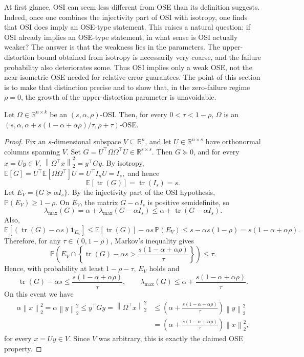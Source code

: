 \documentclass[onefignum,onetabnum]{siamart251216}
\newcommand{\R}{\mathbb{R}}
\newcommand{\E}{\mathbb{E}}
\newcommand{\Prob}{\mathbb{P}}
\newcommand{\norm}[1]{\left\lVert #1 \right\rVert}
\begin{document}
At first glance, OSI can seem less different from OSE than its definition suggests. Indeed, once one combines the injectivity part of OSI with isotropy, one finds that OSI does imply an OSE-type statement.  This raises a natural question: if OSI already implies an OSE-type statement, in what sense is OSI actually weaker? The answer is that the weakness lies in the parameters.  The upper-distortion bound obtained from isotropy is necessarily very coarse,  and the failure probability also deteriorates some.  Thus OSI implies only a weak OSE, not the near-isometric OSE needed for relative-error guarantees. The point of this section is to make that distinction precise and to show that, in the zero-failure regime $\rho=0$, the growth of the upper-distortion parameter is unavoidable. 

\begin{proposition}\label{prop:osi-markov-ose}
Let $\Omega\in\R^{n\times k}$ be an $(s,\alpha,\rho)$-OSI. Then, for every $0<\tau<1-\rho$, $\Omega$ is an $(s,\alpha,\alpha+s(1-\alpha+\alpha\rho)/\tau,\rho+\tau)$-OSE.
\end{proposition}

\begin{proof}
Fix an $s$-dimensional subspace $V\subseteq\R^n$, and let
$U\in\R^{n\times s}$ have orthonormal columns spanning $V$.
Set
$
G = U^\top \Omega\Omega^\top U \in \R^{s\times s}.
$
Then $G\succeq 0$, and for every $x=Uy\in V$,
$
\norm{\Omega^\top x}_2^2 = y^\top G y.
$ By isotropy,
$
\mathbb E[G]
= U^\top \mathbb E[\Omega\Omega^\top]U
= U^\top I_n U
= I_s,
$
and hence
\[
\mathbb E[\operatorname{tr}(G)] = \operatorname{tr}(I_s)=s.
\]
Let
$
E_V=\{G\succeq \alpha I_s\}.
$
By the injectivity part of the OSI hypothesis, $\Prob(E_V)\ge 1-\rho$.  On $E_V$, the matrix $G-\alpha I_s$ is positive semidefinite, so
\[
\lambda_{\max}(G)=
\alpha+\lambda_{\max}(G-\alpha I_s)
\le
\alpha+\operatorname{tr}(G-\alpha I_s).
\]
Also,
\[
\E\!\left[(\operatorname{tr}(G)-\alpha s)\mathbf 1_{E_V}\right]
\le
\E[\operatorname{tr}(G)]-\alpha s\,\Prob(E_V)
\le
s-\alpha s(1-\rho)
=
s(1-\alpha+\alpha\rho).
\]
Therefore, for any $\tau\in(0,1-\rho)$, Markov's inequality gives
\[
\Prob\!\left(
E_V
\cap
\left\{
\operatorname{tr}(G)-\alpha s>
\frac{s(1-\alpha+\alpha\rho)}{\tau}
\right\}
\right)
\le \tau.
\]
Hence, with probability at least $1-\rho-\tau$,  $E_V$ holds and
\[
\operatorname{tr}(G)-\alpha s
\le
\frac{s(1-\alpha+\alpha\rho)}{\tau},
\qquad
\lambda_{\max}(G)\le \alpha+\frac{s(1-\alpha+\alpha\rho)}{\tau}.
\]
On this event we have 
\[
\begin{aligned}
\alpha \norm{x}_2^2
=
\alpha \norm{y}_2^2
\le
y^\top G y
=
\norm{\Omega^\top x}_2^2
& \le
\left(\alpha+\frac{s(1-\alpha+\alpha\rho)}{\tau}\right)\norm{y}_2^2\\
& =
\left(\alpha+\frac{s(1-\alpha+\alpha\rho)}{\tau}\right)\norm{x}_2^2,
\end{aligned}
\]
for every $x=Uy\in V$. Since $V$ was arbitrary, this is exactly the claimed OSE property.
\end{proof}
\end{document}
